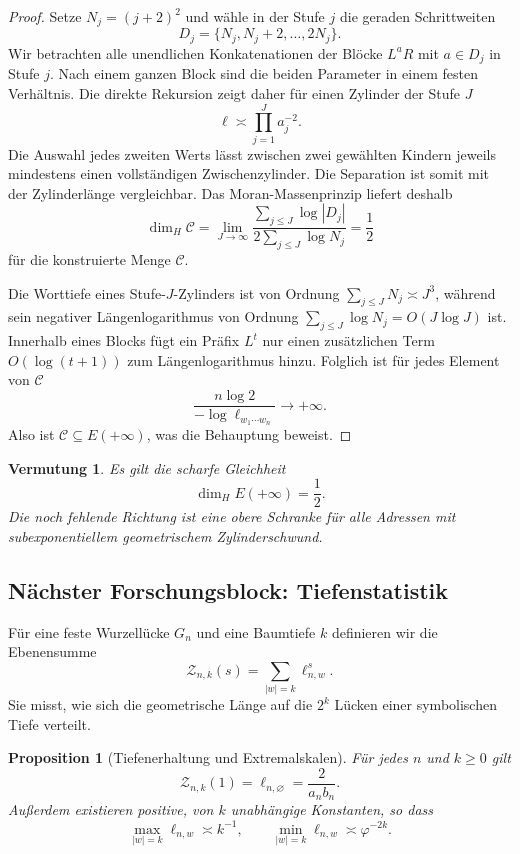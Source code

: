 \documentclass[11pt,a4paper]{article}
\newcommand{\Haus}{\operatorname{dim}_{H}}
\newtheorem{conjecture}[remark]{Vermutung}
\newtheorem{proposition}[remark]{Proposition}
\begin{document}
\begin{proof}
Setze $N_j=(j+2)^2$ und wähle in der Stufe $j$ die geraden Schrittweiten
\[
 D_j=\{N_j,N_j+2,\ldots,2N_j\}.
\]
Wir betrachten alle unendlichen Konkatenationen der Blöcke $L^aR$ mit
$a\in D_j$ in Stufe $j$. Nach einem ganzen Block sind die beiden
Parameter in einem festen Verhältnis. Die direkte Rekursion zeigt daher
für einen Zylinder der Stufe $J$
\[
 \ell\asymp\prod_{j=1}^J a_j^{-2}.
\]
Die Auswahl jedes zweiten Werts lässt zwischen zwei gewählten Kindern
jeweils mindestens einen vollständigen Zwischenzylinder. Die
Separation ist somit mit der Zylinderlänge vergleichbar. Das
Moran-Massenprinzip liefert deshalb
\[
 \Haus\mathcal C
 =\lim_{J\to\infty}
 \frac{\sum_{j\le J}\log|D_j|}
 {2\sum_{j\le J}\log N_j}=\frac12
\]
für die konstruierte Menge $\mathcal C$.

Die Worttiefe eines Stufe-$J$-Zylinders ist von Ordnung
$\sum_{j\le J}N_j\asymp J^3$, während sein negativer Längenlogarithmus
von Ordnung $\sum_{j\le J}\log N_j=O(J\log J)$ ist. Innerhalb eines
Blocks fügt ein Präfix $L^t$ nur einen zusätzlichen Term
$O(\log(t+1))$ zum Längenlogarithmus hinzu. Folglich ist für jedes
Element von $\mathcal C$
\[
 \frac{n\log2}{-\log\ell_{w_1\cdots w_n}}\longrightarrow+\infty.
\]
Also ist $\mathcal C\subseteq E(+\infty)$, was die Behauptung beweist.
\end{proof}

\begin{conjecture}
Es gilt die scharfe Gleichheit
\[
 \Haus E(+\infty)=\frac12.
\]
Die noch fehlende Richtung ist eine obere Schranke für alle Adressen mit
subexponentiellem geometrischem Zylinderschwund.
\end{conjecture}

\subsection{Nächster Forschungsblock: Tiefenstatistik}

Für eine feste Wurzellücke $G_n$ und eine Baumtiefe $k$ definieren wir
die Ebenensumme
\[
 \mathcal Z_{n,k}(s)=\sum_{|w|=k}\ell_{n,w}^{s}.
\]
Sie misst, wie sich die geometrische Länge auf die $2^k$ Lücken einer
symbolischen Tiefe verteilt.

\begin{proposition}[Tiefenerhaltung und Extremalskalen]
Für jedes $n$ und $k\ge0$ gilt
\[
 \mathcal Z_{n,k}(1)=\ell_{n,\varnothing}
 =\frac{2}{a_nb_n}.
\]
Außerdem existieren positive, von $k$ unabhängige Konstanten, so dass
\[
 \max_{|w|=k}\ell_{n,w}\asymp k^{-1},
 \qquad
 \min_{|w|=k}\ell_{n,w}\asymp\varphi^{-2k}.
\]
\end{proposition}
\end{document}
